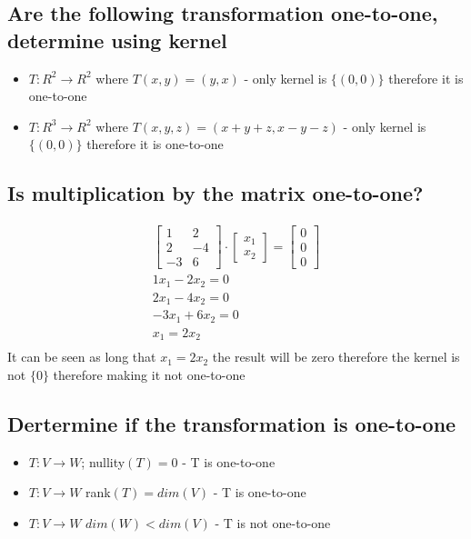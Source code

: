 \documentclass[12pt, a4paper]{article}
\begin{document}
		\subsection{Are the following transformation one-to-one, determine using kernel}
			\begin{itemize}
				\item $T: R^2\rightarrow R^2$ where $T(x,y)=(y,x)$ - only kernel is $\{(0,0)\}$ therefore it is one-to-one
				\item $T: R^3\rightarrow R^2$ where $T(x,y,z)=(x+y+z,x-y-z)$ - only kernel is $\{(0,0)\}$ therefore it is one-to-one
			\end{itemize} 
		\subsection{Is multiplication by the matrix one-to-one?}
			\begin{align*}
				\begin{bmatrix}1&2\\2&-4\\-3&6\end{bmatrix}\cdot \begin{bmatrix}x_1\\x_2\end{bmatrix}=\begin{bmatrix}0\\0\\0\end{bmatrix}\\
				1x_1-2x_2=0\\
				2x_1-4x_2=0\\
				-3x_1+6x_2=0\\
				x_1=2x_2\\
			\end{align*}
			It can be seen as long that $x_1=2x_2$ the result will be zero therefore the kernel is not $\{0\}$ therefore making it not one-to-one
		\subsection{Dertermine if the transformation is one-to-one}
			\begin{itemize}
				\item $T:V\rightarrow W$; nullity$(T)=0$ - T is one-to-one
				\item $T:V\rightarrow W$ rank$(T)=dim(V)$ - T is one-to-one
				\item $T:V\rightarrow W$ $dim(W)<dim(V)$ - T is not one-to-one
			\end{itemize}		
\end{document}
